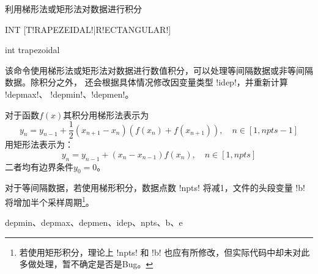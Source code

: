 \label{cmd:int}

利用梯形法或矩形法对数据进行积分

\begin{SACSTX}
INT [T!RAPEZEIDAL!|R!ECTANGULAR!]
\end{SACSTX}

\begin{SACDFT}
int trapezoidal
\end{SACDFT}

该命令使用梯形法或矩形法对数据进行数值积分，可以处理等间隔数据或非等间隔数据。除积分之外，
还会根据具体情况修改因变量类型 !idep!，并重新计算 !depmax!、
!depmin!、!depmen!。

对于函数$f(x)$其积分用梯形法表示为
\[
    y_n = y_{n-1} + \frac{1}{2}(x_{n+1}-x_n) (f(x_n)+f(x_{n+1})), \quad n\in[1,npts-1]
\]
用矩形法表示为：
\[
    y_n = y_{n-1} + (x_n-x_{n-1})f(x_n), \quad n\in[1,npts]
\]
二者均有边界条件$y_0=0$。

对于等间隔数据，若使用梯形积分，数据点数 !npts! 将减1，文件的头段变量
!b! 将增加半个采样周期\footnote{若使用矩形积分，理论上 !npts! 和
!b! 也应有所修改，但实际代码中却未对此多做处理，暂不确定是否是Bug。}。

depmin、depmax、depmen、idep、npts、b、e
